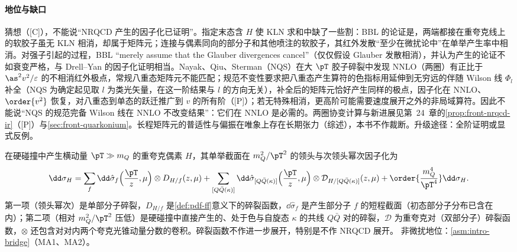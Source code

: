 \paragraph{地位与缺口}
猜想（[C]），不能说“NRQCD 产生的因子化已证明”。指定末态含 $H$ 使 KLN 求和中缺了一些割：BBL 的论证是，两端都接在重夸克线上的软胶子虽无 KLN 相消，却属于矩阵元；连接与偶素同向的部分子和其他喷注的软胶子，其红外发散“至少在微扰论中”在单举产生率中相消。对强子引起的过程，BBL “merely assume that the Glauber divergences cancel”（仅仅假设 Glauber 发散相消），并认为产生的论证不如衰变严格，与 Drell--Yan 的因子化证明相当\cite[第~VI.A~节]{BodwinBraatenLepage1995}。Nayak、Qiu、Sterman（NQS）在大 $\pT$ 胶子碎裂中发现 NNLO（两圈）有正比于 $\as^2v^2/\varepsilon$ 的不相消红外极点，常规八重态矩阵元不能匹配；规范不变性要求把八重态产生算符的色指标用延伸到无穷远的伴随 Wilson 线 $\Phi_l$ 补全（NQS 为确定起见取 $l$ 为类光矢量，在这一阶结果与 $l$ 的方向无关），补全后的矩阵元恰好产生同样的极点，因子化在 NNLO、$\order{v^2}$ 恢复\cite{NayakQiuSterman2005a,NayakQiuSterman2005b}，对八重态到单态的跃迁推广到 $v$ 的所有阶\cite{NayakQiuSterman2006}（[P]）；若无特殊相消，更高阶可能需要速度展开之外的非局域算符\cite{NayakQiuSterman2005a}。因此不能说“NQS 的规范完备 Wilson 线在 NNLO 不改变结果”：它们在 NNLO 是必需的。两圈协变计算与新进展见第~24~章的\cref{prop:front-nrqcd-ir}（[P]）与\cref{sec:front-quarkonium}。长程矩阵元的普适性与偏振在唯象上存在长期张力\cite{Butenschoen:2010rq,Butenschoen:2011yh,Butenschoen:2012px,Chao:2012iv}（综述\cite{BrambillaEtAl2011,Lansberg:2019adr}），本书不作裁断。升级途径：全阶证明或显式反例。

\begin{proposition}\label{prop:heavy-quarkonium-fragmentation}
在硬碰撞中产生横动量 $\pT\gg m_Q$ 的重夸克偶素 $H$，其单举截面在 $m_Q^2/\pT^2$ 的领头与次领头幂次因子化为
\begin{equation}\label{eq:heavy-frag}
\dd\sigma_{H}=\sum_f\dd\hat\sigma_{f}\Big(\frac{\pT}{z},\mu\Big)\otimes D_{H/f}(z,\mu)
+\sum_{[Q\bar Q(\kappa)]}\dd\hat\sigma_{[Q\bar Q(\kappa)]}\Big(\frac{\pT}{z},\mu\Big)\otimes\mathcal D_{H/[Q\bar Q(\kappa)]}(z,\mu)
+\order{\frac{m_Q^4}{\pT^4}}\dd\sigma_H .
\end{equation}
第一项（领头幂次）是单部分子碎裂，$D_{H/f}$ 是\cref{def:pdf-ff}意义下的碎裂函数，$\dd\hat\sigma_f$ 是产生部分子 $f$ 的短程截面（初态部分子分布已含在内）；第二项（相对 $m_Q^2/\pT^2$ 压低）是硬碰撞中直接产生的、处于色与自旋态 $\kappa$ 的共线 $Q\bar Q$ 对的碎裂，$\mathcal D$ 为重夸克对（双部分子）碎裂函数，$\otimes$ 还包含对对内两个夸克光锥动量分数的卷积。碎裂函数不作进一步展开，特别是不作 NRQCD 展开。
非微扰地位：\cref{asm:intro-bridge}（MA1、MA2）。
\end{proposition}

